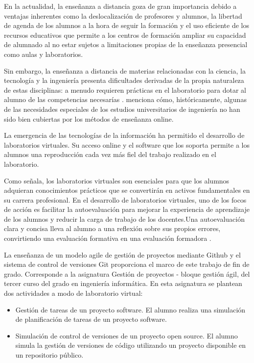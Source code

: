 
En la actualidad, la enseñanza a distancia goza de gran importancia debido a ventajas inherentes como la deslocalización de profesores y alumnos, la libertad de agenda de los alumnos a la hora de seguir la formación y el uso eficiente de los recursos educativos que permite a los centros de formación ampliar su capacidad de alumnado al no estar sujetos a limitaciones propias de la enseñanza presencial como aulas y laboratorios.

Sin embargo, la enseñanza a distancia de materias relacionadas con la ciencia, la tecnología y  la ingeniería  presenta dificultades derivadas de la propia naturaleza de estas disciplinas: a menudo requieren prácticas en el laboratorio para dotar al alumno de las competencias necesarías . \cite{bourne2019} menciona  cómo, históricamente, algunas de las necesidades especiales de los estudios universitarios de ingeniería no han sido bien cubiertas por los métodos de enseñanza online.

La emergencia de las tecnologías de la información ha permitido el desarrollo de laboratorios virtuales. Su acceso online y el software que los soporta permite a los alumnos una reproducción cada vez más fiel del trabajo realizado en el laboratorio.

Como \cite{tejado2018}  señala, los laboratorios virtuales son esenciales para que los alumnos adquieran conocimientos prácticos que se convertirán en  activos fundamentales en su  carrera profesional. En el desarrollo de laboratorios virtuales, uno de los focos de acción es facilitar la autoevaluación para mejorar la experiencia de aprendizaje de los alumnos y reducir la carga de trabajo de los docentes.Una autoevaluación clara y concisa lleva al alumno a una reflexión sobre sus propios errores, convirtiendo una evaluación formativa en una evaluación formadora \cite{sánchez2009}.

La enseñanza de un modelo agile de gestión de proyectos mediante Github y el sistema de control de versiones Git proporciona el marco de este trabajo de fin de grado. Corresponde a la asignatura Gestión de proyectos - bloque gestión ágil, del tercer curso del grado en ingeniería informática. En esta asignatura se plantean dos actividades a modo de laboratorio virtual:

\begin{itemize}
	\item Gestión de tareas de un proyecto software. El alumno realiza una simulación de planificación de tareas de un proyecto software.
	\item Simulación de control de versiones de un proyecto open source. El alumno simula la gestión de versiones de código utilizando un proyecto disponible en un repositorio público.
\end{itemize}

